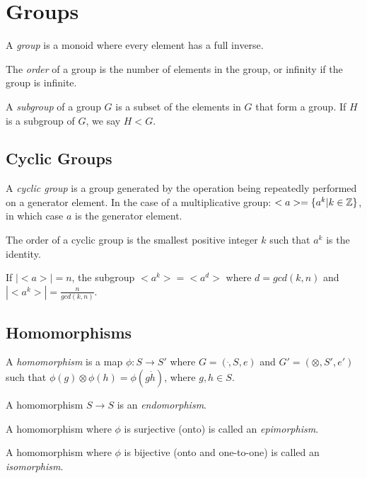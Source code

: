 \chapter{Groups}

A \emph{group} is a monoid where every element has a full inverse.

The \emph{order} of a group is the number of elements in the group, or
infinity if the group is infinite.

A \emph{subgroup} of a group $G$ is a subset of the elements in $G$
that form a group.  If $H$ is a subgroup of $G$, we say $H < G$.

\section{Cyclic Groups}

A \emph{cyclic group} is a group generated by the operation being
repeatedly performed on a generator element.  In the case of a
multiplicative group: $<a> = \{ a^k | k \in \mathbb{Z} \}$, in which case $a$
is the generator element.

The order of a cyclic group is the smallest positive integer $k$ such
that $a^k$ is the identity.

If $|<a>| = n$, the subgroup $<a^k> = <a^d>$ where $d = gcd(k,n)$ and
$|<a^k>| = \frac{n}{gcd(k,n)}$.

\section{Homomorphisms}

A \emph{homomorphism} is a map $\phi : S \rightarrow S'$ where $G =
(\dot,S,e)$ and $G' = (\otimes,S',e')$ such that $\phi(g) \otimes
\phi(h) = \phi(g \dot h)$, where $g,h \in S$.

A homomorphism $S \rightarrow S$ is an \emph{endomorphism}.

A homomorphism where $\phi$ is surjective (onto) is called an
\emph{epimorphism}.

A homomorphism where $\phi$ is bijective (onto and one-to-one) is
called an \emph{isomorphism}.
